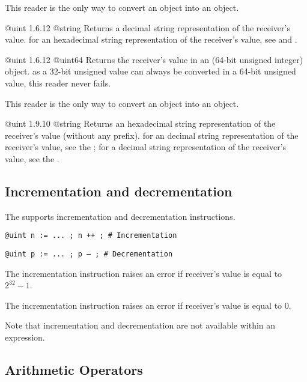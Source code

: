 This reader is the only way to convert an  object into an  object.


{@uint}
{1.6.12}
{@string}
{Returns a decimal string representation of the receiver's value.}
{for an hexadecimal string representation of the receiver's value, see  and .}




{@uint}
{1.6.12}
{@uint64}
{Returns the receiver's value in an  (64-bit unsigned integer) object.}
{as a 32-bit unsigned value can always be converted in a 64-bit unsigned value, this reader never fails.}

This reader is the only way to convert an  object into an  object.




{@uint}
{1.9.10}
{@string}
{Returns an hexadecimal string representation of the receiver's value (without any prefix).}
{for an decimal string representation of the receiver's value, see the ; for a decimal string representation of the receiver's value, see the .}






\subsection{Incrementation and decrementation}

The  supports incrementation and decrementation instructions.

\texttt{@uint n := ... ; n ++ ; \# Incrementation}

\texttt{@uint p := ... ; p -- ; \# Decrementation}\newline

The incrementation instruction raises an error if receiver's value is equal to $2^{32}-1$.\newline

The incrementation instruction raises an error if receiver's value is equal to 0.\newline

Note that incrementation and decrementation are not available within an expression.




\subsection{Arithmetic Operators}

